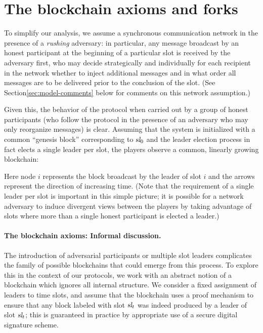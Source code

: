 \section{The blockchain axioms and forks}

To simplify our analysis, we assume a synchronous communication
network in the presence of a \emph{rushing} adversary: in particular,
any message broadcast by an honest participant at the beginning of a
particular slot is received by the adversary first, who may decide
strategically and individually for each recipient in the network
whether to inject additional messages and in what order all messages
are to be delivered prior to the conclusion of the slot. (See
Section\ref{sec:model-comments} below for comments on this network
assumption.)

Given this, the behavior of the protocol when carried out by a group
of honest participants (who follow the protocol in the presence of an
adversary who may only reorganize messages) is clear. Assuming that
the system is initialized with a common ``genesis block''
corresponding to $\textsl{sl}_0$ and the leader election process in fact
elects a single leader per slot, the players observe a common,
linearly growing blockchain:
\begin{center}
\end{center}
\noindent
Here node $i$ represents the block broadcast by the leader of slot $i$
and the arrows represent the direction of increasing time. (Note that
the requirement of a single leader per slot is important in this
simple picture; it is possible for a network adversary to induce
divergent views between the players by taking advantage of slots where
more than a single honest participant is elected a leader.)

\paragraph{The blockchain axioms: Informal discussion.}
The introduction of adversarial participants or multiple slot leaders
complicates the family of possible blockchains that could emerge from
this process. To explore this in the context of our protocols, we work
with an abstract notion of a blockchain which
ignores all internal structure. We consider a fixed assignment of
leaders to time slots, and assume that the blockchain uses a proof
mechanism to ensure that any block labeled with slot $\textsl{sl}_t$ was
indeed produced by a leader of slot $\textsl{sl}_t$; this is guaranteed in
practice by appropriate use of a secure digital signature scheme.

